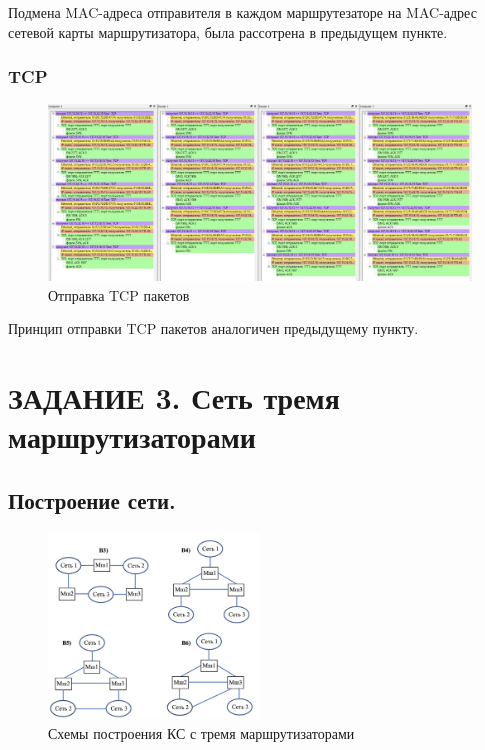 \documentclass[12pt,onecolumn]{article}
\begin{document}
Подмена MAC-адреса отправителя в каждом маршрутезаторе на MAC-адрес сетевой карты маршрутизатора, была рассотрена в предыдущем пункте.

\subsubsection{TCP}
\begin{figure}[H]
    \centering
    \includegraphics[width=\textwidth]{image/part-2/tcp.png}
    \caption{Отправка TCP пакетов}
\end{figure}
Принцип отправки TCP пакетов аналогичен предыдущему пункту.
\section{ЗАДАНИЕ 3. Сеть тремя маршрутизаторами}
\subsection{Построение сети.}

\begin{figure}[H]
    \centering
    \includegraphics[width=0.5\textwidth]{image/part-3/task3.png}
    \caption{Схемы построения КС с тремя маршрутизаторами}
\end{figure}
\end{document}
